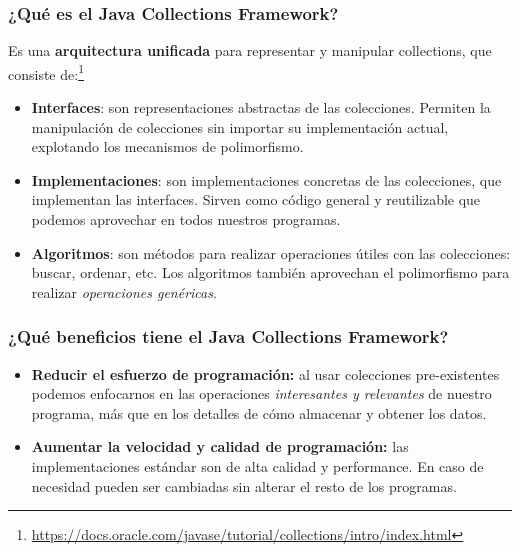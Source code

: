 \documentclass{beamer}
\begin{document}
\begin{frame}
  \frametitle{¿Qué es el Java Collections Framework?}

  Es una \textbf{arquitectura unificada} para representar y manipular
  collections, que consiste
  de:\footnote{\url{https://docs.oracle.com/javase/tutorial/collections/intro/index.html}}

  \begin{small}

  \begin{itemize}
  \item \textbf{Interfaces}: son representaciones abstractas de las
    colecciones. Permiten la manipulación de colecciones sin importar
    su implementación actual, explotando los mecanismos de
    polimorfismo.
    
  \item \textbf{Implementaciones}: son implementaciones concretas de
    las colecciones, que implementan las interfaces. Sirven como
    código general y reutilizable que podemos aprovechar en todos
    nuestros programas.
    
  \item \textbf{Algoritmos}: son métodos para realizar operaciones
    útiles con las colecciones: buscar, ordenar, etc. Los algoritmos
    también aprovechan el polimorfismo para realizar \emph{operaciones
      genéricas}.
    
  \end{itemize}
  \end{small}
  
\end{frame}

\begin{frame}
  \frametitle{¿Qué beneficios tiene el Java Collections Framework?}

  \begin{itemize}
    
  \item \textbf{Reducir el esfuerzo de programación:} al usar
    colecciones pre-existentes podemos enfocarnos en las operaciones
    \emph{interesantes y relevantes} de nuestro programa, más que en
    los detalles de cómo almacenar y obtener los datos.
    
  \item \textbf{Aumentar la velocidad y calidad de programación:} las
    implementaciones estándar son de alta calidad y performance. En
    caso de necesidad pueden ser cambiadas sin alterar el resto de los
    programas.
    
  \end{itemize}
  
\end{frame}
\end{document}
